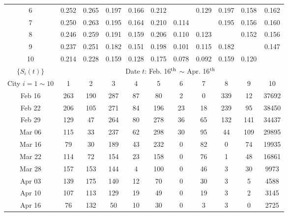 \documentclass[11pt,twocolumn]{article}
\begin{document}
\begin{spacing}{1.6}
\begin{table}[btp]
\begin{tabular}{c|cccccccccc}
    6 & 0.252 & 0.265 & 0.197 & 0.166 & 0.212 &  & 0.129 & 0.197 & 0.158 & 0.162 \\ 
    7 & 0.250 & 0.263 & 0.195 & 0.164 & 0.210 & 0.114 &  & 0.195 & 0.156 & 0.160 \\ 
    8 & 0.246 & 0.259 & 0.191 & 0.159 & 0.206 & 0.110 & 0.123 &  & 0.152 & 0.156 \\ 
    9 & 0.237 & 0.251 & 0.182 & 0.151 & 0.198 & 0.101 & 0.115 & 0.182 &  & 0.147 \\ 
    10 & 0.214 & 0.228 & 0.159 & 0.128 & 0.175 & 0.078 & 0.092 & 0.159 & 0.120 &  \\ 
    \toprule
    \toprule
    $\{S_{i}(t)\}$ & \multicolumn{10}{c}{Date $t$: Feb. 16$^{\rm th}$ $\sim$ Apr. 16$^{\rm th}$} \\
    City $i=1\sim10$ & 1 & 2 & 3 & 4 & 5 & 6 & 7 & 8 & 9 & 10 \\ \hline
    Feb 16 & 263 & 190 & 287 & 87 & 80 & 2 & 0 & 339 & 12 & 37692   \\ 
    Feb 22 & 206 & 105 & 271 & 84 & 196 & 23 & 18 & 239 & 95 & 38450 \\ 
    Feb 29 & 129 & 47 & 264 & 80 & 278 & 36 & 65 & 132 & 141 & 34437 \\ 
    Mar 06 & 115 & 33 & 237 & 62 & 298 & 30 & 95 & 44 & 109 & 29895 \\ 
    Mar 16 & 79 & 30 & 189 & 43 & 232 & 0 & 82 & 0 & 74 & 19935 \\ 
    Mar 22 & 114 & 72 & 154 & 23 & 158 & 0 & 76 & 1 & 48 & 16861 \\ 
    Mar 28 & 157 & 153 & 144 & 4 & 100 & 0 & 46 & 3 & 30 & 9973 \\ 
    Apr 03 & 139 & 175 & 140 & 12 & 70 & 0 & 30 & 3 & 5 & 4588 \\ 
    Apr 10 & 107 & 113 & 129 & 19 & 49 & 0 & 19 & 3 & 2 & 3145 \\ 
    Apr 16 & 76 & 132 & 50 & 10 & 30 & 0 & 3 & 3 & 0 & 2725 \\ 
    \bottomrule
\end{tabular}
\end{table}
\end{spacing}
\end{document}
